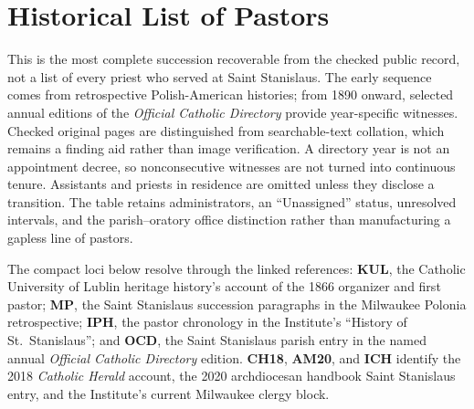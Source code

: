 \section{Historical List of Pastors}

This is the most complete succession recoverable from the checked public
record, not a list of every priest who served at Saint Stanislaus. The early
sequence comes from retrospective Polish-American histories; from 1890 onward,
selected annual editions of the \emph{Official Catholic Directory} provide
year-specific witnesses. Checked original pages are distinguished from
searchable-text collation, which remains a finding aid rather than image
verification. A directory year is not an appointment decree, so nonconsecutive
witnesses are not turned into continuous tenure. Assistants and priests in
residence are omitted unless they disclose a transition. The table retains
administrators, an ``Unassigned'' status, unresolved intervals, and the
parish--oratory office distinction rather than manufacturing a gapless line of
pastors.

The compact loci below resolve through the linked references: \textbf{KUL}, the
Catholic University of Lublin heritage history's account of the 1866 organizer
and first pastor; \textbf{MP}, the Saint Stanislaus succession paragraphs in
the Milwaukee Polonia retrospective; \textbf{IPH}, the pastor chronology in the
Institute's ``History of St.~Stanislaus''; and \textbf{OCD}, the Saint
Stanislaus parish entry in the named annual \emph{Official Catholic Directory}
edition. \textbf{CH18}, \textbf{AM20}, and \textbf{ICH} identify the 2018
\emph{Catholic Herald} account, the 2020 archdiocesan handbook Saint Stanislaus
entry, and the Institute's current Milwaukee clergy block.

